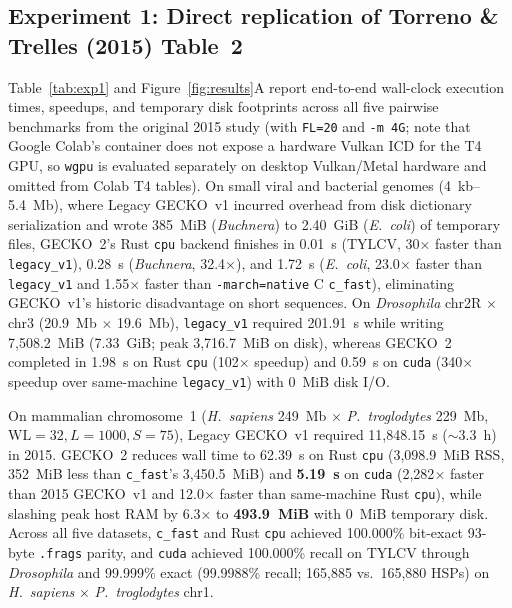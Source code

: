 \documentclass[pdflatex,sn-vancouver,Numbered]{sn-jnl}
\newcommand{\hlDrosSpeedupCpuVsVone}{102$\times$}
\newcommand{\hlDrosSpeedupCudaVsVone}{340$\times$}
\newcommand{\hlChrOneSpeedupCudaVsCpu}{12.0$\times$}
\newcommand{\hlChrOneSpeedupCudaVsPub}{2,282$\times$}
\newcommand{\hlExactParityPct}{100.000\%}
\newcommand{\eOneTylcvCpu}{0.01}
\newcommand{\eOneBuchCpu}{0.28}
\newcommand{\eOneEcoliCpu}{1.72}
\newcommand{\eOneDrosVone}{201.91}
\newcommand{\eOneDrosCpu}{1.98}
\newcommand{\eOneDrosCuda}{0.59}
\newcommand{\eOneDrosDisk}{3,716.7}
\newcommand{\eOneDrosWr}{7,508.2}
\newcommand{\eOneChrOneCpu}{62.39}
\newcommand{\eOneChrOneCuda}{5.19}
\begin{document}
\subsection{Experiment 1: Direct replication of Torreno \& Trelles (2015) Table~2}\label{subsec:exp1}

Table~\ref{tab:exp1} and Figure~\ref{fig:results}A report end-to-end wall-clock execution times, speedups, and temporary disk footprints across all five pairwise benchmarks from the original 2015 study (with \texttt{FL=20} and \texttt{-m 4G}; note that Google Colab's container does not expose a hardware Vulkan ICD for the T4 GPU, so \texttt{wgpu} is evaluated separately on desktop Vulkan/Metal hardware and omitted from Colab T4 tables). On small viral and bacterial genomes (4~kb--5.4~Mb), where Legacy GECKO~v1 incurred overhead from disk dictionary serialization and wrote 385~MiB (\textit{Buchnera}) to 2.40~GiB (\textit{E.~coli}) of temporary files, GECKO~2's Rust \texttt{cpu} backend finishes in \eOneTylcvCpu{}~s (TYLCV, 30$\times$ faster than \texttt{legacy\_v1}), \eOneBuchCpu{}~s (\textit{Buchnera}, 32.4$\times$), and \eOneEcoliCpu{}~s (\textit{E.~coli}, 23.0$\times$ faster than \texttt{legacy\_v1} and 1.55$\times$ faster than \texttt{-march=native} C \texttt{c\_fast}), eliminating GECKO~v1's historic disadvantage on short sequences. On \textit{Drosophila} chr2R $\times$ chr3 (20.9~Mb $\times$ 19.6~Mb), \texttt{legacy\_v1} required \eOneDrosVone{}~s while writing \eOneDrosWr{}~MiB (7.33~GiB; peak \eOneDrosDisk{}~MiB on disk), whereas GECKO~2 completed in \eOneDrosCpu{}~s on Rust \texttt{cpu} (\hlDrosSpeedupCpuVsVone{} speedup) and \eOneDrosCuda{}~s on \texttt{cuda} (\hlDrosSpeedupCudaVsVone{} speedup over same-machine \texttt{legacy\_v1}) with 0~MiB disk I/O.

On mammalian chromosome~1 (\textit{H.~sapiens} 249~Mb $\times$ \textit{P.~troglodytes} 229~Mb, $\text{WL}=32, L=1000, S=75$), Legacy GECKO~v1 required 11,848.15~s ($\sim$3.3~h) in 2015. GECKO~2 reduces wall time to \eOneChrOneCpu{}~s on Rust \texttt{cpu} (3,098.9~MiB RSS, 352~MiB less than \texttt{c\_fast}'s 3,450.5~MiB) and \textbf{\eOneChrOneCuda{}~s} on \texttt{cuda} (\hlChrOneSpeedupCudaVsPub{} faster than 2015 GECKO~v1 and \hlChrOneSpeedupCudaVsCpu{} faster than same-machine Rust \texttt{cpu}), while slashing peak host RAM by 6.3$\times$ to \textbf{493.9~MiB} with 0~MiB temporary disk. Across all five datasets, \texttt{c\_fast} and Rust \texttt{cpu} achieved \hlExactParityPct{} bit-exact 93-byte \texttt{.frags} parity, and \texttt{cuda} achieved 100.000\% recall on TYLCV through \textit{Drosophila} and 99.999\% exact (99.9988\% recall; 165,885 vs.\ 165,880 HSPs) on \textit{H.~sapiens} $\times$ \textit{P.~troglodytes} chr1.
\end{document}
